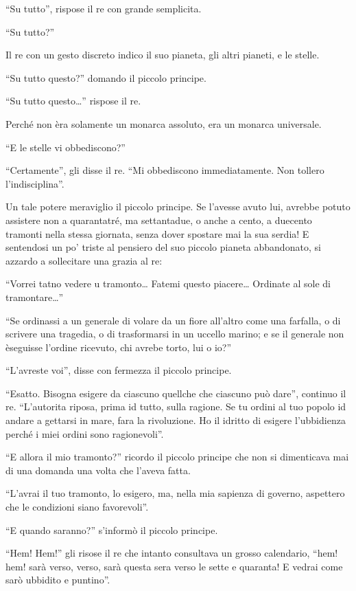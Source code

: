 \documentclass[11pt]{scrbook}
\begin{document}
``Su tutto'', rispose il re con grande semplicita.

``Su tutto?''

Il re con un gesto discreto indico il suo pianeta, gli altri pianeti, e
le stelle.

``Su tutto questo?'' domando il piccolo principe.

``Su tutto questo\ldots{}'' rispose il re.

Perché non èra solamente un monarca assoluto, era un monarca universale.

``E le stelle vi obbediscono?''

``Certamente'', gli disse il re. ``Mi obbediscono immediatamente. Non
tollero l'indisciplina''.

Un tale potere meraviglio il piccolo principe. Se l'avesse avuto lui,
avrebbe potuto assistere non a quarantatré, ma settantadue, o anche a
cento, a duecento tramonti nella stessa giornata, senza dover spostare
mai la sua serdia! E sentendosi un po' triste al pensiero del suo
piccolo pianeta abbandonato, si azzardo a sollecitare una grazia al re:

``Vorrei tatno vedere u tramonto\ldots{} Fatemi questo piacere\ldots{}
Ordinate al sole di tramontare\ldots{}''

``Se ordinassi a un generale di volare da un fiore all'altro come una
farfalla, o di scrivere una tragedia, o di trasformarsi in un uccello
marino; e se il generale non èseguisse l'ordine ricevuto, chi avrebe
torto, lui o io?''

``L'avreste voi'', disse con fermezza il piccolo principe.

``Esatto. Bisogna esigere da ciascuno quellche che ciascuno può dare'',
continuo il re. ``L'autorita riposa, prima id tutto, sulla ragione. Se
tu ordini al tuo popolo id andare a gettarsi in mare, fara la
rivoluzione. Ho il idritto di esigere l'ubbidienza perché i miei ordini
sono ragionevoli''.

``E allora il mio tramonto?'' ricordo il piccolo principe che non si
dimenticava mai di una domanda una volta che l'aveva fatta.

``L'avrai il tuo tramonto, lo esigero, ma, nella mia sapienza di
governo, aspettero che le condizioni siano favorevoli''.

``E quando saranno?'' s'informò il piccolo principe.

``Hem! Hem!'' gli risose il re che intanto consultava un grosso
calendario, ``hem! hem! sarà verso, verso, sarà questa sera verso le
sette e quaranta! E vedrai come sarò ubbidito e puntino''.
\end{document}
